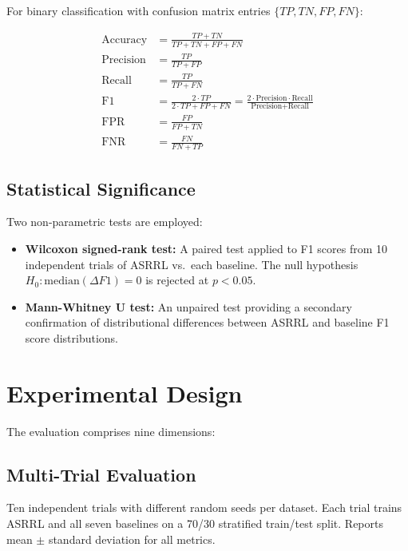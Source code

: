 \documentclass[12pt, letterpaper, oneside]{report}
\newcommand{\ASRRL}{\textsc{ASRRL}}
\begin{document}
For binary classification with confusion matrix entries $\{TP, TN, FP, FN\}$:

\begin{align}
\text{Accuracy} &= \frac{TP + TN}{TP + TN + FP + FN} \label{eq:accuracy} \\[6pt]
\text{Precision} &= \frac{TP}{TP + FP} \label{eq:precision} \\[6pt]
\text{Recall} &= \frac{TP}{TP + FN} \label{eq:recall} \\[6pt]
\text{F1} &= \frac{2 \cdot TP}{2 \cdot TP + FP + FN} = \frac{2 \cdot \text{Precision} \cdot \text{Recall}}{\text{Precision} + \text{Recall}} \label{eq:f1} \\[6pt]
\text{FPR} &= \frac{FP}{FP + TN} \label{eq:fpr} \\[6pt]
\text{FNR} &= \frac{FN}{FN + TP} \label{eq:fnr}
\end{align}

\subsection{Statistical Significance}

Two non-parametric tests are employed:

\begin{itemize}
    \item \textbf{Wilcoxon signed-rank test:} A paired test applied to F1 scores from 10 independent trials of \ASRRL{} vs.\ each baseline. The null hypothesis $H_0: \text{median}(\Delta F1) = 0$ is rejected at $p < 0.05$.

    \item \textbf{Mann-Whitney U test:} An unpaired test providing a secondary confirmation of distributional differences between \ASRRL{} and baseline F1 score distributions.
\end{itemize}


\section{Experimental Design}
\label{sec:experimental_design}

The evaluation comprises nine dimensions:

\subsection{Multi-Trial Evaluation}

Ten independent trials with different random seeds per dataset. Each trial trains \ASRRL{} and all seven baselines on a 70/30 stratified train/test split. Reports mean $\pm$ standard deviation for all metrics.
\end{document}
